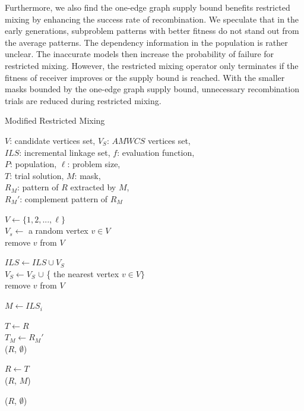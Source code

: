 \documentclass{sig-alternate-05-2015}
\begin{document}
Furthermore, we also find the one-edge graph supply bound benefits restricted mixing by enhancing the success rate of recombination. We speculate that in the early generations, subproblem patterns with better fitness do not stand out from the average patterns. The dependency information in the population is rather unclear. The inaccurate models then increase the probability of failure for restricted mixing. However, the restricted mixing operator only terminates if the fitness of receiver improves or the supply bound is reached. With the smaller masks bounded by the one-edge graph supply bound, unnecessary recombination trials are reduced during restricted mixing. 


\begin{algorithm}
\caption{Modified Restricted Mixing}\label{algo_disjdecomp}

$V$: candidate vertices set, $V_S$: $AMWCS$ vertices set,  \\
$ILS$: incremental linkage set, $f$: evaluation function, \\
$P$: population, $\ell$: problem size, \\
$T$: trial solution, $M$: mask, \\
${R_M}$: pattern of $R$ extracted by $M$, \\
${R_M}'$: complement pattern of ${R_M}$


\BlankLine
$V \leftarrow \{ 1, 2, ..., \ell \}$ \\
$V_s \leftarrow$ a random vertex $v \in V$ \\
remove $v$ from $V$ \\

 {

    $ILS \leftarrow ILS \cup V_{S}$ \\
    $V_S \leftarrow V_S$ $\cup$ \{ the nearest vertex $v \in V \}$ \\
    remove $v$ from $V$ \\
}

\BlankLine
{} {

    $M \leftarrow ILS_i$ \\

     {

        $T \leftarrow R$ \\
        $T_M \leftarrow {R_M}'$ \\

         {
            \Return ($R$, $\emptyset$) 
        }

         {
            $R \leftarrow T$ \\
            \Return ($R$, $M$)
        }
    }
}
\Return ($R$, $\emptyset$) 
\end{algorithm}
\end{document}
